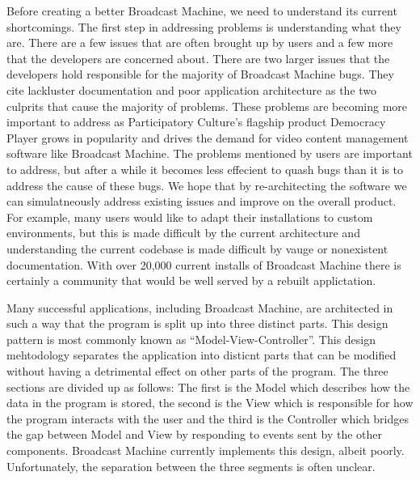 \documentclass[a4paper,12pt]{report}
\begin{document}
Before creating a better Broadcast Machine, we need to understand its current shortcomings.
The first step in addressing problems is understanding what they are. There are a few issues that are often brought up by users and a few more that the developers are concerned about.
There are two larger issues that the developers hold responsible for the majority of Broadcast Machine bugs.
They cite  lackluster documentation and poor application architecture as the two culprits that cause the majority of problems. These problems are becoming more important to address as Participatory Culture's flagship product Democracy Player grows in popularity and drives the demand for video content management software like Broadcast Machine. The problems mentioned by users are important to address, but after a while it becomes less effecient to quash bugs than it is to address the cause of these bugs. We hope that by re-architecting the software we can simulatneously address existing issues and improve on the overall product.
For example, many users would like to adapt their installations to custom environments, but this is made difficult by the current architecture and understanding the current codebase is made difficult by vauge or nonexistent documentation. With over 20,000 current installs of Broadcast Machine there is certainly a community that would be well served by a rebuilt applictation. \footnotemark

Many successful applications, including Broadcast Machine, are architected in such a way that the program is split up into three distinct parts. This design pattern is most commonly known as ``Model-View-Controller''. This design mehtodology separates the application into disticnt parts that can be modified without having a detrimental effect on other parts of the program. The three sections are divided up as follows: The first is the Model which describes how the data in the program is stored, the second is the View which is responsible for how the program interacts with the user and the third is the Controller which bridges the gap between Model and View by responding to events sent by the other components. Broadcast Machine currently implements this design, albeit poorly. Unfortunately, the separation between the three segments is often unclear.
\end{document}
